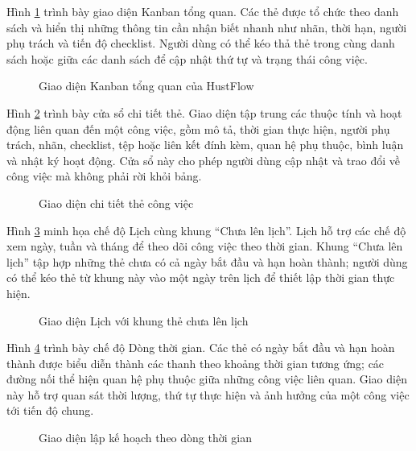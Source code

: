 \documentclass[../DoAn.tex]{subfiles}
\begin{document}
Hình \ref{fig:chapter4_result_kanban} trình bày giao diện Kanban tổng quan. Các thẻ được tổ chức theo danh sách và hiển thị những thông tin cần nhận biết nhanh như nhãn, thời hạn, người phụ trách và tiến độ checklist. Người dùng có thể kéo thả thẻ trong cùng danh sách hoặc giữa các danh sách để cập nhật thứ tự và trạng thái công việc.

\begin{figure}[H]
    \centering
    \caption{Giao diện Kanban tổng quan của HustFlow}
    \label{fig:chapter4_result_kanban}
\end{figure}

Hình \ref{fig:chapter4_result_card_detail} trình bày cửa sổ chi tiết thẻ. Giao diện tập trung các thuộc tính và hoạt động liên quan đến một công việc, gồm mô tả, thời gian thực hiện, người phụ trách, nhãn, checklist, tệp hoặc liên kết đính kèm, quan hệ phụ thuộc, bình luận và nhật ký hoạt động. Cửa sổ này cho phép người dùng cập nhật và trao đổi về công việc mà không phải rời khỏi bảng.

\begin{figure}[H]
    \centering
    \caption{Giao diện chi tiết thẻ công việc}
    \label{fig:chapter4_result_card_detail}
\end{figure}

Hình \ref{fig:chapter4_result_calendar} minh họa chế độ Lịch cùng khung ``Chưa lên lịch''. Lịch hỗ trợ các chế độ xem ngày, tuần và tháng để theo dõi công việc theo thời gian. Khung ``Chưa lên lịch'' tập hợp những thẻ chưa có cả ngày bắt đầu và hạn hoàn thành; người dùng có thể kéo thẻ từ khung này vào một ngày trên lịch để thiết lập thời gian thực hiện.

\begin{figure}[H]
    \centering
    \caption{Giao diện Lịch với khung thẻ chưa lên lịch}
    \label{fig:chapter4_result_calendar}
\end{figure}

Hình \ref{fig:chapter4_result_timeline} trình bày chế độ Dòng thời gian. Các thẻ có ngày bắt đầu và hạn hoàn thành được biểu diễn thành các thanh theo khoảng thời gian tương ứng; các đường nối thể hiện quan hệ phụ thuộc giữa những công việc liên quan. Giao diện này hỗ trợ quan sát thời lượng, thứ tự thực hiện và ảnh hưởng của một công việc tới tiến độ chung.

\begin{figure}[H]
    \centering
    \caption{Giao diện lập kế hoạch theo dòng thời gian}
    \label{fig:chapter4_result_timeline}
\end{figure}
\end{document}
